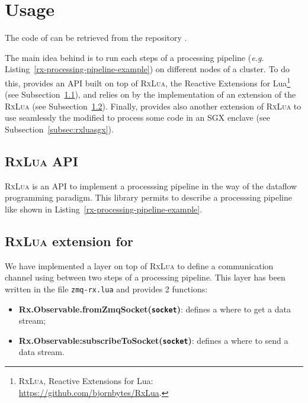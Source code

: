 
\section{\SS{} Usage}
\label{sec:securestreamusage}

The code of \SS{} can be retrieved from the repository \securestreamrepo{}.

The main idea behind \SS{} is to run each steps of a processing pipeline (\textit{e.g.} Listing~\ref{rx-processing-pipeline-example}) on different nodes of a cluster.
To do this, \SS{} provides an API built on top of \textsc{RxLua}, the Reactive Extensions for Lua\footnote{\textsc{RxLua}, Reactive Extensions for Lua: \url{https://github.com/bjornbytes/RxLua}.} (see Subsection~\ref{subsec:rxluaapi}), and relies on \zmq{} by the implementation of an extension of the \textsc{RxLua} (see Subsection~\ref{subsec:rxluazmq}).
Finally, \SS{} provides also another extension of \textsc{RxLua} to use seamlessly the \luavm{} modified to process some code in an SGX enclave (see Subsection~\ref{subsec:rxluasgx}).


\subsection{\textsc{RxLua} API}
\label{subsec:rxluaapi}

\textsc{RxLua} is an API to implement a processsing pipeline in the way of the dataflow programming paradigm.
This library permits to describe a processsing pipeline like shown in Listing~\ref{rx-processing-pipeline-example}.



\newpage

\subsection{\textsc{RxLua} extension for \zmq{}}
\label{subsec:rxluazmq}

We have implemented a layer on top of \textsc{RxLua} to define a communication channel using \zmq{} between two steps of a processing pipeline.
This layer has been written in the file \texttt{zmq-rx.lua} and provides 2 functions:

\begin{itemize}
  \item \textbf{Rx.Observable.fromZmqSocket(\texttt{socket})}: defines a \zmq{} where to get a data stream;
  \item \textbf{Rx.Observable:subscribeToSocket(\texttt{socket})}: defines a \zmq{} where to send a data stream.
\end{itemize}

